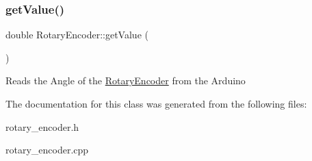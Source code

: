 \subsubsection{\texorpdfstring{get\+Value()}{getValue()}}
{\footnotesize\ttfamily double Rotary\+Encoder\+::get\+Value (\begin{DoxyParamCaption}{ }\end{DoxyParamCaption})}

Reads the Angle of the \hyperlink{classRotaryEncoder}{Rotary\+Encoder} from the Arduino 

The documentation for this class was generated from the following files\+:\begin{DoxyCompactItemize}
\item 
rotary\+\_\+encoder.\+h\item 
rotary\+\_\+encoder.\+cpp\end{DoxyCompactItemize}
